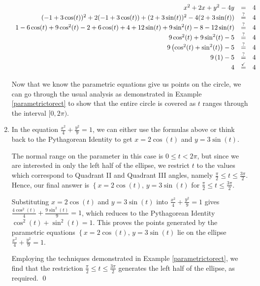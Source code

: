 \begin{ex}
\begin{enumerate}
\[\begin{array}{rcl}
x^2 + 2x + y^2 - 4y & = & 4  \\
(-1+3\cos(t))^2 + 2(-1+3\cos(t)) + (2+3\sin(t))^2 - 4(2+3\sin(t)) & \stackrel{\text{?}}{=} & 4  \\
1  - 6\cos(t) + 9\cos^{2}(t) - 2 + 6\cos(t) + 4 + 12\sin(t) + 9\sin^{2}(t) - 8 - 12\sin(t) & \stackrel{\text{?}}{=} & 4  \\
9\cos^{2}(t) + 9\sin^{2}(t) -5 & \stackrel{\text{?}}{=} & 4 \\
9\left(\cos^{2}(t) + \sin^{2}(t)\right) -5 & \stackrel{\text{?}}{=} & 4  \\
9\left(1\right) -5 & \stackrel{\text{?}}{=} & 4 \\
4 & \stackrel{\text{\checkmark}}{=} & 4  \\ \end{array} \]

Now that we know the parametric equations give us points on the circle, we can go through the usual analysis as demonstrated in Example \ref{parametrictorect}  to show that the entire circle is covered as $t$ ranges through the interval $[0,2\pi)$.

\item  In the equation $\frac{x^2}{4} + \frac{y^2}{9} = 1$, we can either use the formulas above or think back to the Pythagorean Identity to get  $x = 2\cos(t)$ and $y = 3\sin(t)$.  

\smallskip

The normal range on the parameter in this case is $0 \leq t < 2\pi$, but since we are interested in only the left half of the ellipse, we restrict $t$ to the values which correspond to Quadrant II and Quadrant III angles, namely  $\frac{\pi}{2} \leq t \leq \frac{3\pi}{2}$.   Hence, our final answer is $\left\{  x = 2\cos(t), \,   y = 3\sin(t) \right.$ for $\frac{\pi}{2} \leq t \leq \frac{3\pi}{2}$.  

\smallskip

Substituting $x = 2\cos(t)$ and $y = 3\sin(t)$ into  $\frac{x^2}{4} + \frac{y^2}{9} = 1$ gives $\frac{4\cos^{2}(t)}{4} + \frac{9 \sin^{2}(t)}{9} = 1$, which reduces to the Pythagorean Identity $\cos^{2}(t) + \sin^{2}(t) = 1$.  This proves the points generated by the parametric equations  $\left\{  x = 2\cos(t), \,   y = 3\sin(t) \right.$ lie on the ellipse $\frac{x^2}{4} + \frac{y^2}{9} = 1$. 

\smallskip

 Employing the techniques demonstrated in Example \ref{parametrictorect}, we find that the restriction $\frac{\pi}{2} \leq t \leq \frac{3\pi}{2}$ generates the left half of the ellipse, as required.  \qed

\end{enumerate}

\end{ex}

